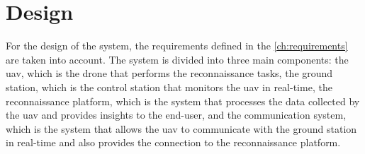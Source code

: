 \chapter{Design}\label{ch:design}

For the design of the system, the requirements defined in the \cref{ch:requirements} are taken into account. The system is divided into three main components: the \gls{uav}, which is the drone that performs the reconnaissance tasks, the ground station, which is the control station that monitors the \gls{uav} in real-time, the reconnaissance platform, which is the system that processes the data collected by the \gls{uav} and provides insights to the end-user, and the communication system, which is the system that allows the \gls{uav} to communicate with the ground station in real-time and also provides the connection to the reconnaissance platform.





